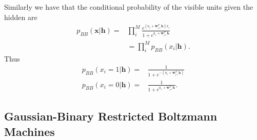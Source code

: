 \documentclass[twoside,english]{uiofysmaster}
\begin{document}
Similarly we have that the conditional probability of the visible units given the hidden are
\begin{align}
	p_{BB} (\bm{x}|\bm{h}) =& \prod_i^M \frac{ e^{ (a_i + \bm{w}_{i\ast}^T \bm{h}) x_i} }{ 1 + e^{a_i + \bm{w}_{i\ast}^T \bm{h}} } \\
	&= \prod_i^M p_{BB} (x_i | \bm{h}) .
\end{align}
Thus
\begin{align}
	p_{BB} (x_i=1 | \bm{h}) =& \frac{1}{1 + e^{-(a_i + \bm{w}_{i\ast}^T \bm{h} )}} \\
	p_{BB} (x_i=0 | \bm{h}) =& \frac{1}{1 + e^{a_i + \bm{w}_{i\ast}^T \bm{h} }} .
\end{align}






\subsection{Gaussian-Binary Restricted Boltzmann Machines}
\end{document}
